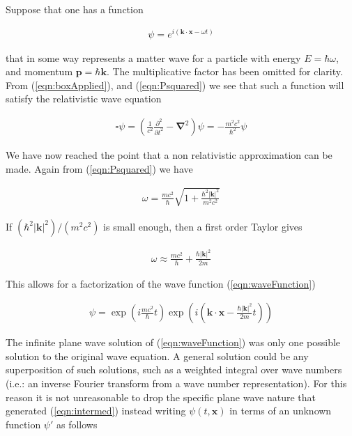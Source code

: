 \documentclass[]{eliblog}
\newcommand{\Abs}[1]{{\left\lvert{#1}\right\rvert}}
\newcommand{\Bk}[0]{\mathbf{k}}
\newcommand{\Bp}[0]{\mathbf{p}}
\newcommand{\Bx}[0]{\mathbf{x}}
\newcommand{\spacegrad}[0]{\boldsymbol{\nabla}}
\newcommand{\delambertian}[0]{\square}
\begin{document}
Suppose that one has a function

\begin{align}\label{eqn:waveFunction}
\psi = e^{ i( \Bk \cdot \Bx - \omega t) }
\end{align}

that in some way represents a matter wave for a particle with energy $E = \hbar \omega$, and momentum
 $\Bp = \hbar \Bk$.  The multiplicative factor has been omitted for clarity.
From (\ref{eqn:boxApplied}), and
(\ref{eqn:Psquared})
we see that such a function will satisfy the relativistic wave equation

\begin{align}
\delambertian \psi = \left( \frac{1}{c^2}\frac{\partial^2}{{\partial t}^2} - \spacegrad^2 \right) \psi = - \frac{m^2 c^2}{\hbar^2} \psi
\end{align}

We have now reached the point that a non relativistic approximation can be made.
Again from (\ref{eqn:Psquared}) we have

\begin{align}
\omega = \frac{m c^2}{\hbar} \sqrt{ 1 + \frac{\hbar^2 \Abs{\Bk}^2}{m^2 c^2}}
\end{align}

If $(\hbar^2 \Abs{\Bk}^2)/(m^2 c^2)$ is small enough, then a first order Taylor gives

\begin{align}
\omega \approx \frac{m c^2}{\hbar} + \frac{\hbar \Abs{\Bk}^2}{2 m}
\end{align}

This allows for a factorization of the wave function (\ref{eqn:waveFunction})

\begin{align}\label{eqn:intermed}
\psi =
\exp\left( i \frac{m c^2}{\hbar} t \right)
\exp\left( i \left(
\Bk \cdot \Bx
-\frac{\hbar \Abs{\Bk}^2}{2 m}t
\right) \right)
\end{align}

The infinite plane wave solution of (\ref{eqn:waveFunction}) was only one possible solution to the original wave equation.
A general solution could be any superposition of such solutions, such as a weighted integral over wave numbers (i.e.: an
inverse Fourier transform from a wave number representation).  For this reason it is not unreasonable to drop the specific plane wave nature that generated (\ref{eqn:intermed}) instead writing $\psi(t,\Bx)$ in terms of an unknown function $\psi'$ as follows
\end{document}
